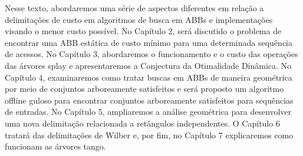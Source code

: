 
Nesse texto, abordaremos uma série de aspectos diferentes em relação a delimitações de custo em algoritmos de busca em ABBs e implementações visando o menor custo possível. No Capítulo 2, será discutido o problema de encontrar uma ABB estática de custo mínimo para uma determinada sequência de acessos. No Capítulo 3, abordaremos o funcionamento e o custo das operações das árvores splay e apresentaremos a Conjectura da Otimalidade Dinâmica. 
No Capítulo 4, examinaremos como tratar buscas em ABBs de maneira geométrica por meio de conjuntos arboreamente satisfeitos e será proposto um algoritmo offline guloso para encontrar conjuntos arboreamente satisfeitos para sequências de entradas. %
No Capítulo 5, ampliaremos a análise geométrica para desenvolver uma nova delimitação relacionada a retângulos independentes. O Capítulo 6 tratará das delimitações de Wilber e, por fim, no Capítulo 7 explicaremos como funcionam as árvores tango.